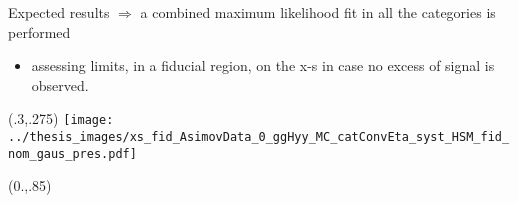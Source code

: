 \documentclass[10pt,UKenglish, leqno, xcolor = dvipsnames]{beamer}
\begin{document}
	\begin{frame}{Expected results}
		\vspace{.4cm}
		$\Longrightarrow$ a combined maximum likelihood fit in all the categories is performed
		\begin{itemize}
			\item assessing limits, in a fiducial region, on the x-s in case no excess of signal is observed.
		\end{itemize}		
		\begin{textblock}{1}(.3,.275)
			\texttt{[image: ../thesis\_images/xs\_fid\_AsimovData\_0\_ggHyy\_MC\_catConvEta\_syst\_HSM\_fid\_nom\_gaus\_pres.pdf]}	
		\end{textblock}
		\begin{textblock}{1}(0.,.85)
			\begin{figure}
			\end{figure}
		\end{textblock}
	\end{frame}
\end{document}
